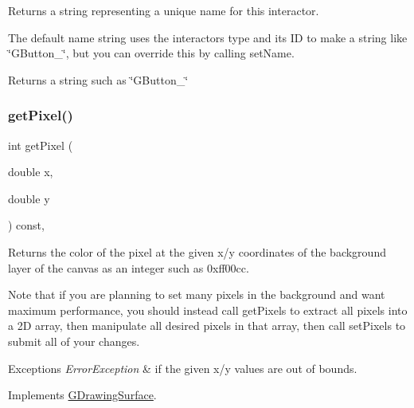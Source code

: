Returns a string representing a unique name for this interactor. 

The default name string uses the interactor\textquotesingle{}s type and its ID to make a string like \char`\"{}\+G\+Button\+\_\char`\"{}, but you can override this by calling set\+Name. \begin{DoxyReturn}{Returns}
a string such as \char`\"{}\+G\+Button\+\_\char`\"{} 
\end{DoxyReturn}
\mbox{\label{classsgl_1_1GCanvas_a342aaa6de62a4a324a2e4f3921db1d3e}} 
\subsubsection{\texorpdfstring{get\+Pixel()}{getPixel()}}
{\footnotesize\ttfamily int get\+Pixel (\begin{DoxyParamCaption}\item[{double}]{x,  }\item[{double}]{y }\end{DoxyParamCaption}) const\hspace{0.3cm}{\ttfamily [override]}, {\ttfamily [virtual]}}



Returns the color of the pixel at the given x/y coordinates of the background layer of the canvas as an integer such as 0xff00cc. 

Note that if you are planning to set many pixels in the background and want maximum performance, you should instead call get\+Pixels to extract all pixels into a 2D array, then manipulate all desired pixels in that array, then call set\+Pixels to submit all of your changes.


\begin{DoxyExceptions}{Exceptions}
{\em Error\+Exception} & if the given x/y values are out of bounds. \\
\hline
\end{DoxyExceptions}


Implements \mbox{\hyperlink{classsgl_1_1GDrawingSurface_a40f3e3f64a8263e13b7162e15b2979ee}{G\+Drawing\+Surface}}.

\mbox{\label{classsgl_1_1GCanvas_ae28117ec01d58208d381fba886030850}} 

